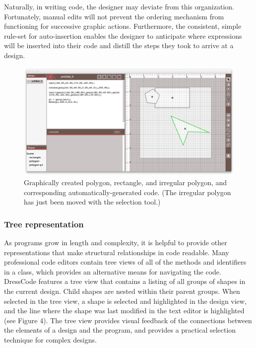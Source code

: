\documentclass{sigchi}
\begin{document}
Naturally, in writing code, the designer may deviate from this organization. Fortunately, manual edits will not prevent the ordering mechanism from functioning for successive graphic actions. Furthermore, the consistent, simple rule-set for auto-insertion enables the designer to anticipate where expressions will be inserted into their code and distill the steps they took to arrive at a design.

\begin{center}
\begin{figure}[h!]
\includegraphics[width=\columnwidth]{images/auto_generated_code.jpg}
\caption{Graphically created polygon, rectangle, and irregular polygon, and corresponding automatically-generated code. (The irregular polygon has just been moved with the selection tool.)}
\label{fig:auto_generated_code}
\end{figure}
\end{center}
\vspace{-20pt}

\subsubsection{Tree representation}
As programs grow in length and complexity, it is helpful to provide other representations that make structural relationships in code readable. Many professional code editors contain tree views of all of the methods and identifiers in a class, which provides an alternative means for navigating the code. DressCode features a tree view that contains a listing of all groups of shapes in the current design. Child shapes are nested within their parent groups. When selected in the tree view, a shape is selected and highlighted in the design view, and the line where the shape was last modified in the text editor is highlighted (see Figure 4). The tree view provides visual feedback of the connections between the elements of a design and the program, and provides a practical selection technique for complex designs.
\end{document}
